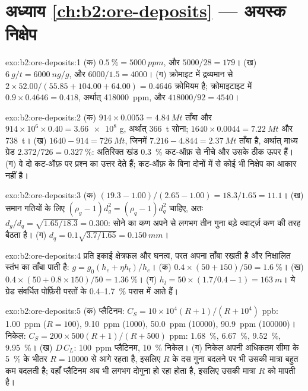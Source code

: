 \section*{अध्याय \ref{ch:b2:ore-deposits} --- अयस्क निक्षेप}

\begin{solution}{exo:b2:ore-deposits:1}
(क) $\qty{0.5}{\percent} = \qty{5000}{ppm}$, और $5000/28 = 179$। (ख) $\qty{6}{g/t} = \qty{6000}{ng/g}$,
और $6000/1.5 = 4000$। (ग) क्रोमाइट में द्रव्यमान से $2 \times 52.00/(55.85 + 104.00 + 64.00) = 0.4646$
क्रोमियम है; क्रोमाइटाइट में $0.9 \times 0.4646 = 0.418$, अर्थात् \qty{418000}{ppm}, और
$418000/92 = 4540$।
\end{solution}

\begin{solution}{exo:b2:ore-deposits:2}
(क) $914 \times 0.0053 = \qty{4.84}{Mt}$ ताँबा और $914 \times 10^6 \times 0.40 = \num{3.66e8}$ g,
अर्थात् \qty{366}{t} सोना; $1640 \times 0.0044 = \qty{7.22}{Mt}$ और \qty{738}{t}। (ख) $1640 - 914 =
\qty{726}{Mt}$, जिनमें $7.216 - 4.844 = \qty{2.37}{Mt}$ ताँबा है, अर्थात् माध्य ग्रेड
$2.372/726 = \qty{0.327}{\percent}$: अतिरिक्त खंड \qty{0.3}{\percent} कट-ऑफ़ से नीचे
और उसके ठीक ऊपर हैं। (ग) वे दो कट-ऑफ़ पर प्रश्न का उत्तर देते हैं; कट-ऑफ़ के बिना दोनों में से कोई भी
निक्षेप का आकार नहीं है।
\end{solution}

\begin{solution}{exo:b2:ore-deposits:3}
(क) $(19.3 - 1.00)/(2.65 - 1.00) = 18.3/1.65 = 11.1$। (ख) समान गतियों के लिए $(\rho_g - 1)d_g^2 =
(\rho_q - 1)d_q^2$ चाहिए, अतः $d_g/d_q = \sqrt{1.65/18.3} = 0.300$: सोने का कण अपने से लगभग तीन गुना
बड़े क्वार्ट्ज़ कण की तरह बैठता है। (ग) $d_q = 0.1\sqrt{3.7/1.65} = \qty{0.150}{mm}$।
\end{solution}

\begin{solution}{exo:b2:ore-deposits:4}
प्रति इकाई क्षेत्रफल और घनत्व, परत अपना ताँबा रखती है और निक्षालित स्तंभ का ताँबा पाती है:
$g = g_0(h_e + \eta h_l)/h_e$। (क) $0.4 \times (50 + 150)/50 = \qty{1.6}{\percent}$।
(ख) $0.4 \times (50 + 0.8 \times 150)/50 = \qty{1.36}{\percent}$। (ग) $h_l = 50 \times (1.7/0.4 - 1)
= \qty{163}{m}$। ये ग्रेड संवर्धित पोर्फ़िरी परतों के 0.4--\qty{1.7}{\percent} परास में
आते हैं।
\end{solution}

\begin{solution}{exo:b2:ore-deposits:5}
(क) प्लैटिनम: $C_S = 10 \times 10^4 (R + 1)/(R + 10^4)$ \unit{ppb}: \qty{1.00}{ppm} ($R = 100$),
\qty{9.10}{ppm} (\num{1000}), \qty{50.0}{ppm} (\num{10000}), \qty{90.9}{ppm} (\num{100000})।
निकेल: $C_S = 200 \times 500 (R + 1)/(R + 500)$ \unit{ppm}: \qty{1.68}{\percent}, \qty{6.67}{\percent},
\qty{9.52}{\percent}, \qty{9.95}{\percent}। (ख) $D\,C_L$: \qty{100}{ppm} प्लैटिनम,
\qty{10}{\percent} निकेल। (ग) निकेल अपनी अधिकतम सीमा के \qty{5}{\percent} के भीतर $R = \num{10000}$ से आगे
रहता है, इसलिए $R$ के दस गुना बदलने पर भी उसकी मात्रा बहुत कम बदलती है; वहाँ प्लैटिनम अब भी लगभग दोगुना हो रहा
होता है, इसलिए उसकी मात्रा $R$ को मापती है।
\end{solution}

